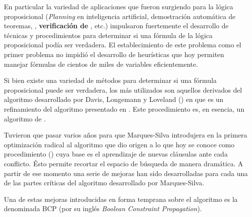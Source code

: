 En particular la variedad de aplicaciones que fueron surgiendo para la lógica
proposicional (\emph{Planning} en inteligencia artificial, demostración
automática de teoremas, \textbf{\mc}, \textbf{verificación de \soft}, etc.)
impulsaron fuertemente el desarrollo de técnicas y procedimientos para
determinar si una fórmula de la lógica proposicional podía ser verdadera. El
establecimiento de este problema como el primer problema \npc
\cite{Cook:1971:CTP:800157.805047} no impidió el desarrollo de heurísticas que
hoy permiten manejar fórmulas de cientos de miles de variables eficientemente.

Si bien existe una variedad de métodos para determinar si una fórmula
proposicional puede ser verdadera, los más utilizados son aquellos derivados
del algoritmo desarrollado por Davis, Longemann y Loveland (\dpll) en
\cite{Davis:1962:MPT:368273.368557} que es un refinamiento del algoritmo
presentado en \cite{Davis:1960:CPQ:321033.321034}. Este procedimiento es, en
esencia, un algoritmo de \bt.

Tuvieron que pasar varios años para que Marques-Silva introdujera en \cite
{marques-silva:iccad96} la primera optimización radical al algoritmo \dpll que
dio origen a lo que hoy se conoce como procedimiento \cdcl (\CDCL) cuya base
es el aprendizaje de nuevas cláusulas ante cada conflicto. Ésto permite
recortar el espacio de búsqueda de manera dramática. A partir de ese momento
una serie de mejoras han sido desarrolladas para cada una de las partes críticas
del algoritmo desarrollado por Marques-Silva.

Una de estas mejoras introducidas en forma temprana sobre el algoritmo \dpll es la denominada BCP \cite{???} (por su inglés \emph{Boolean Constraint Propagation}). 

